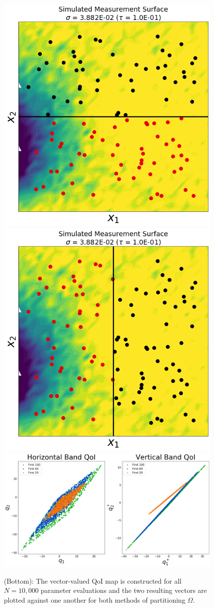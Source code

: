 \begin{figure}[htbp]
\centering
  \includegraphics[width=0.475\linewidth]{figures/pde-highd/pde-highd_sensors_D2}
  \includegraphics[width=0.475\linewidth]{figures/pde-highd/pde-highd_sensors-alt_D2}
  \includegraphics[width=0.95\linewidth]{figures/pde-highd/pde-highd_geom_D2}
\caption{
(Bottom): The vector-valued QoI map is constructed for all $N=10,000$ parameter evaluations and the two resulting vectors are plotted against one another for both methods of partitioning $\Omega$.
}
\label{fig:pde-highd-2d-geometry}
\end{figure}

